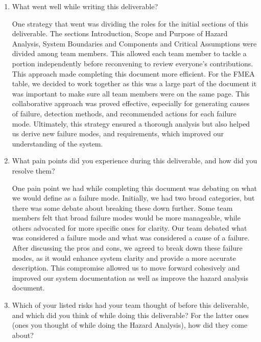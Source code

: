 \documentclass{article}
\begin{document}
\begin{enumerate}
    \item What went well while writing this deliverable?
    
    One strategy that went was dividing the roles for the initial sections of this deliverable. 
    The sections Introduction, Scope and Purpose of Hazard Analysis, System Boundaries and Components and Critical Assumptions were divided among team members.
    This allowed each team member to tackle a portion independently before reconvening to review everyone’s contributions.  
    This approach made completing this document more efficient. 
    For the FMEA table, we decided to work together as this was a large part of the document it was important to make sure all team members were on the same page. 
    This collaborative approach was proved effective, especially for generating causes of failure, detection methods, and recommended actions for each failure mode.
    Ultimately, this strategy ensured a thorough analysis but also helped us derive new failure modes, and requirements, which improved our understanding of the system.
    
    \item What pain points did you experience during this deliverable, and how
    did you resolve them?
    
    One pain point we had while completing this document was debating on what we would define as a failure mode. 
    Initially, we had two broad categories, but there was some debate about breaking these down further. 
    Some team members felt that broad failure modes would be more manageable, while others advocated for more specific ones for clarity. 
    Our team debated what was considered a failure mode and what was considered a cause of a failure. 
    After discussing the pros and cons, we agreed to break down these failure modes, as it would enhance system clarity and provide a more accurate description. 
    This compromise allowed us to move forward cohesively and improved our system documentation as well as improve the hazard analysis document.
    
    \item Which of your listed risks had your team thought of before this
    deliverable, and which did you think of while doing this deliverable? For
    the latter ones (ones you thought of while doing the Hazard Analysis), how
    did they come about?


\end{enumerate}
\end{document}
